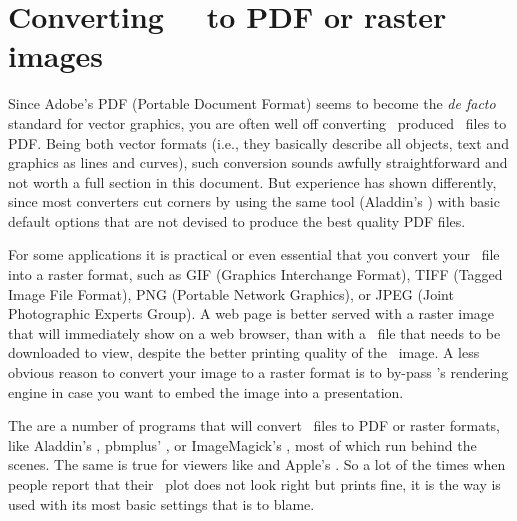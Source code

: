 \section{Converting \gmt\ \PS\ to PDF or raster images}

Since Adobe's PDF (Portable Document Format) seems to become the \emph{de facto} standard for vector graphics, you are often well off converting \GMT\ produced \PS\ files to PDF. Being both vector formats (i.e., they basically describe all objects, text and graphics as lines and curves), such conversion sounds awfully straightforward and not worth a full section in this document. But experience has shown differently, since most converters cut corners by using the same tool (Aladdin's ) with basic default options that are not devised to produce the best quality PDF files.

For some applications it is practical or even essential that you convert your \PS\ file into a raster format, such as GIF (Graphics Interchange Format), TIFF (Tagged Image File Format), PNG (Portable Network Graphics), or JPEG (Joint Photographic Experts Group). A web page is better served with a raster image that will immediately show on a web browser, than with a \PS\ file that needs to be downloaded to view, despite the better printing quality of the \PS\ image. A less obvious reason to convert your image to a raster format is to by-pass 's rendering engine in case you want to embed the image into a presentation.

The are a number of programs that will convert \PS\ files to PDF or raster formats, like Aladdin's , pbmplus' , or ImageMagick's , most of which run  behind the scenes. The same is true for viewers like  and Apple's . So a lot of the times when people report that their \PS\ plot does not look right but prints fine, it is the way  is used with its most basic settings that is to blame.

